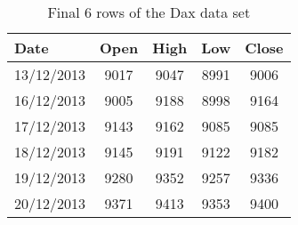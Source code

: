 \begin{table}[ht]
\centering
\caption[Final 6 rows of the Dax data set.]{Final 6 rows of the Dax data set} 
\label{tab:daxtail}
\begin{tabular}{lcccc}
  \toprule Date & Open & High & Low & Close \\ 
  \midrule 13/12/2013 & 9017 & 9047 & 8991 & 9006 \\ 
  16/12/2013 & 9005 & 9188 & 8998 & 9164 \\ 
  17/12/2013 & 9143 & 9162 & 9085 & 9085 \\ 
  18/12/2013 & 9145 & 9191 & 9122 & 9182 \\ 
  19/12/2013 & 9280 & 9352 & 9257 & 9336 \\ 
  20/12/2013 & 9371 & 9413 & 9353 & 9400 \\ 
   \bottomrule \end{tabular}
\end{table}
